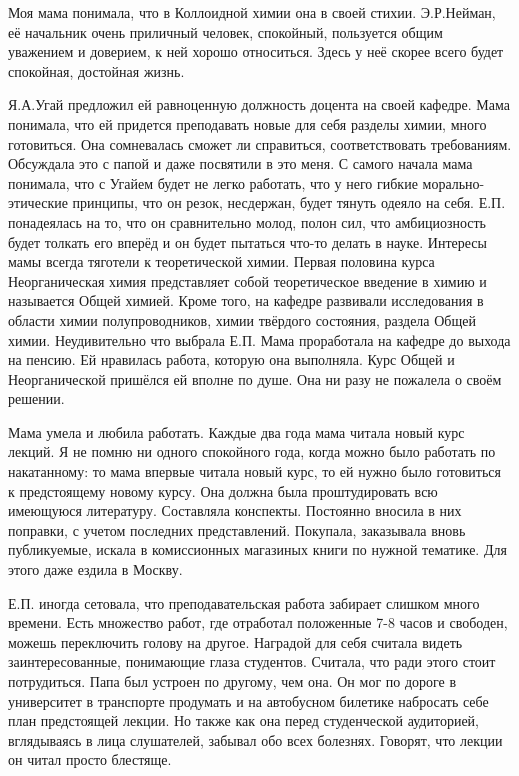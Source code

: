 Моя мама понимала, что в Коллоидной химии она в своей стихии. Э.Р.Нейман, её начальник очень приличный человек, спокойный, пользуется общим уважением и доверием, к ней хорошо относиться. Здесь у неё скорее всего будет спокойная, достойная жизнь.

Я.А.Угай предложил ей равноценную должность доцента на своей кафедре. Мама понимала, что ей придется преподавать новые для себя разделы химии, много готовиться. Она сомневалась сможет ли справиться, соответствовать требованиям. Обсуждала это с папой и даже посвятили в это меня. С самого начала мама понимала, что с Угайем будет не легко работать, что у него гибкие морально-этические принципы, что он резок, несдержан, будет тянуть одеяло на себя. Е.П. понадеялась на то, что он сравнительно молод, полон сил, что амбициозность будет толкать его вперёд и он будет пытаться что-то делать в науке. Интересы мамы всегда тяготели к теоретической химии. Первая половина курса Неорганическая химия представляет собой теоретическое введение в химию и называется Общей химией. Кроме того, на кафедре развивали исследования в области химии полупроводников, химии твёрдого состояния, раздела Общей химии. Неудивительно что выбрала Е.П. Мама проработала на кафедре до выхода на пенсию. Ей нравилась работа, которую она выполняла. Курс Общей и Неорганической пришёлся ей вполне по душе. Она ни разу не пожалела о своём решении.

Мама умела и любила работать. Каждые два года мама читала новый курс лекций. Я не помню ни одного спокойного года, когда можно было работать по накатанному: то мама впервые читала новый курс, то ей нужно было готовиться к предстоящему новому курсу. Она должна была проштудировать всю имеющуюся литературу. Составляла конспекты. Постоянно вносила в них поправки, с учетом последних представлений. Покупала, заказывала вновь публикуемые, искала в комиссионных магазиных книги по нужной тематике. Для этого даже ездила в Москву.

Е.П. иногда сетовала, что преподавательская работа забирает слишком много времени. Есть множество работ, где отработал положенные 7-8 часов и свободен, можешь переключить голову на другое. Наградой для себя считала видеть заинтересованные, понимающие глаза студентов. Считала, что ради этого стоит потрудиться. Папа был устроен по другому, чем она. Он мог по дороге в университет в транспорте продумать и на автобусном билетике набросать себе план предстоящей лекции. Но также как она перед студенческой аудиторией, вглядываясь в лица слушателей, забывал обо всех болезнях. Говорят, что лекции он читал просто блестяще.

